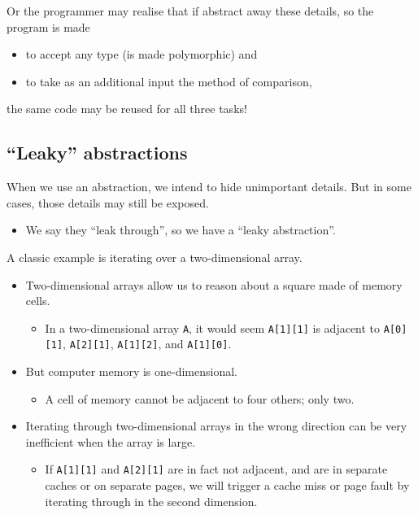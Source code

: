 \documentclass[11pt]{article}
\theoremstyle{definition}
\begin{document}
Or the programmer may realise that if abstract away these details,
so the program is made
\begin{itemize}
\item to accept any type (is made polymorphic) and
\item to take as an additional input the method of comparison,
\end{itemize}
the same code may be reused for all three tasks!

\subsection{“Leaky” abstractions}
\label{sec:org88cacb3}


When we use an abstraction, we intend to hide unimportant details.
But in some cases, those details may still be exposed.
\begin{itemize}
\item We say they “leak through”, so we have a “leaky abstraction”.
\end{itemize}

A classic example is iterating over a two-dimensional array.
\begin{itemize}
\item Two-dimensional arrays allow us to reason about a square made of memory cells.
\begin{itemize}
\item In a two-dimensional array \texttt{A}, it would seem \texttt{A[1][1]} is adjacent
to \texttt{A[0][1]}, \texttt{A[2][1]}, \texttt{A[1][2]}, and \texttt{A[1][0]}.
\end{itemize}
\item But computer memory is one-dimensional.
\begin{itemize}
\item A cell of memory cannot be adjacent to four others; only two.
\end{itemize}
\item Iterating through two-dimensional arrays in the wrong direction
can be very inefficient when the array is large.
\begin{itemize}
\item If \texttt{A[1][1]} and \texttt{A[2][1]} are in fact not adjacent,
and are in separate caches or on separate pages,
we will trigger a cache miss or page fault
by iterating through in the second dimension.
\end{itemize}
\end{itemize}
\end{document}
